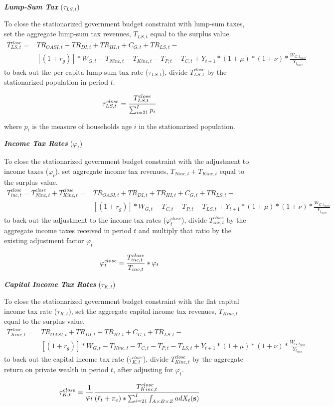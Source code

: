\documentclass[11pt,leqno,fleqn]{article}
\newcommand{\be}{\vspace{-1em}\begin{singlespace}\begin{equation}}
\newcommand{\ee}{\end{equation}\end{singlespace}}
\begin{document}
\begin{flushleft}
\textbf{\textit{Lump-Sum Tax}} ($\tau_{LS,t}$)
\end{flushleft}
To close the stationarized government budget constraint with lump-sum taxes, set the aggregate lump-sum tax revenues, $T_{LS,t}$ equal to the surplus value.
\begin{align*}
T_{LS,t}^{close} = &TR_{OASI,t} + TR_{DI,t} + TR_{HI,t} + C_{G,t} + TR_{LS,t} - \\
&[(1+r_g)]*W_{G,t} - T_{Ninc,t} - T_{Kinc,t} - T_{P,t} - T_{C,t} + Y_{t+1}*(1+\mu)*(1+\nu)*\frac{W_{G,t_{close}}}{Y_{t_{close}}}
\end{align*}
to back out the per-capita lump-sum tax rate ($\tau_{LS,t}$), divide $T_{LS,t}^{close}$ by the stationarized population in period $t$.
\be \tau_{LS,t}^{close} = \frac{T_{LS,t}^{close}}{\sum_{i=21}^I p_i} \notag \ee
where $p_i$ is the measure of households age $i$ in the stationarized population.


\begin{flushleft}
\textbf{\textit{Income Tax Rates}} ($\varphi_t$)
\end{flushleft}
To close the stationarized government budget constraint with the adjustment to income taxes ($\varphi_{t}$), set aggregate income tax revenues, $T_{Ninc,t} + T_{Kinc,t}$ equal to the surplus value.
\begin{align*}
T_{inc,t}^{close} = T_{Ninc,t}^{close} + T_{Kinc,t}^{close} = &TR_{OASI,t} + TR_{DI,t} + TR_{HI,t} + C_{G,t} + TR_{LS,t} -\\ 
&[(1+r_g)]*W_{G,t} - T_{C,t} - T_{P,t} - T_{LS,t}  + Y_{t+1}*(1+\mu)*(1+\nu)*\frac{W_{G,t_{close}}}{Y_{t_{close}}}
\end{align*}
to back out the adjustment to the income tax rates ($\varphi_{t}^{close}$), divide $T_{inc,t}^{close}$ by the aggregate income taxes received in period $t$ and multiply that ratio by the existing adjustment factor $\varphi_t$. 
\be \varphi_{t}^{close} = \frac{T_{inc,t}^{close}}{T_{inc,t}}*\varphi_t \notag \ee


\begin{flushleft}
\textbf{\textit{Capital Income Tax Rates}} ($\tau_{K,t}$)
\end{flushleft}
To close the stationarized government budget constraint with the flat capital income tax rate ($\tau_{K,t}$), set the aggregate capital income tax revenues, $T_{Kinc,t}$ equal to the surplus value.
\begin{align*}
T_{Kinc,t}^{close} = &TR_{OASI,t} + TR_{DI,t} + TR_{HI,t} + C_{G,t} + TR_{LS,t} - \\
&[(1+r_g)]*W_{G,t} - T_{Ninc,t} - T_{C,t} - T_{P,t} - T_{LS,t} + Y_{t+1}*(1+\mu)*(1+\nu)*\frac{W_{G,t_{close}}}{Y_{t_{close}}}
\end{align*}
to back out the capital income tax rate ($\tau_{K,t}^{close}$), divide $T_{Kinc,t}^{close}$ by the aggregate return on private wealth in period $t$, after adjusting for $\varphi_t$.
\be \tau_{K,t}^{close} = \frac{1}{\varphi_t}\frac{T_{Kinc,t}^{close}}{(\tilde{r}_t+\pi_e)*\sum_{i=21}^{I}\int_{A\times B\times Z}a dX_{t}(\mathbf{s})} \notag \ee
\end{document}
